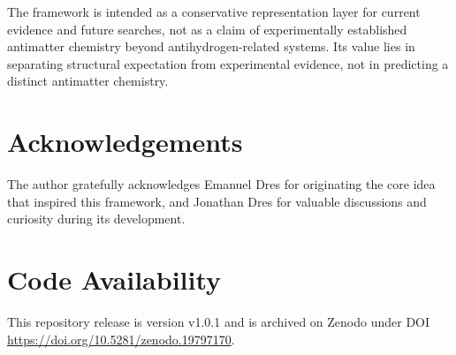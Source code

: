 \documentclass[11pt,a4paper]{article}
\begin{document}
The framework is intended as a conservative representation layer for current evidence and future searches, not as a claim of experimentally established antimatter chemistry beyond antihydrogen-related systems. Its value lies in separating structural expectation from experimental evidence, not in predicting a distinct antimatter chemistry.

\section*{Acknowledgements}

The author gratefully acknowledges Emanuel Dres for originating the core idea
that inspired this framework, and Jonathan Dres for valuable discussions and
curiosity during its development.

\section*{Code Availability}

This repository release is version v1.0.1 and is archived on Zenodo under DOI \url{https://doi.org/10.5281/zenodo.19797170}.
\end{document}
